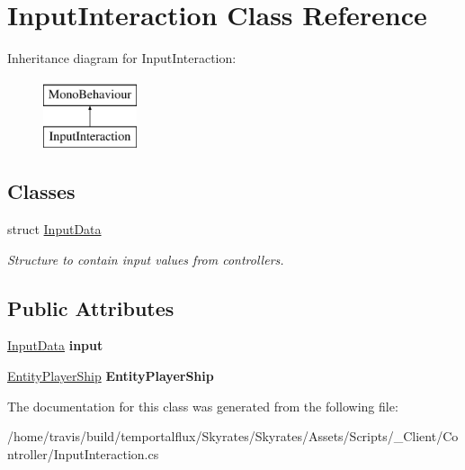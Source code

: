 \hypertarget{class_input_interaction}{\section{Input\-Interaction Class Reference}
\label{class_input_interaction}
}
Inheritance diagram for Input\-Interaction\-:\begin{figure}[H]
\begin{center}
\leavevmode
\includegraphics[height=2.000000cm]{class_input_interaction}
\end{center}
\end{figure}
\subsection*{Classes}
\begin{DoxyCompactItemize}
\item 
struct \hyperlink{struct_input_interaction_1_1_input_data}{Input\-Data}
\begin{DoxyCompactList}\small\item\em Structure to contain input values from controllers. \end{DoxyCompactList}\end{DoxyCompactItemize}
\subsection*{Public Attributes}
\begin{DoxyCompactItemize}
\item 
\hypertarget{class_input_interaction_a65feda331718482c2c867a0b05b4414e}{\hyperlink{struct_input_interaction_1_1_input_data}{Input\-Data} {\bfseries input}}\label{class_input_interaction_a65feda331718482c2c867a0b05b4414e}

\item 
\hypertarget{class_input_interaction_a94a199f25f8c5499bd8ce958164dc059}{\hyperlink{class_skyrates_1_1_client_1_1_entity_player_ship}{Entity\-Player\-Ship} {\bfseries Entity\-Player\-Ship}}\label{class_input_interaction_a94a199f25f8c5499bd8ce958164dc059}

\end{DoxyCompactItemize}


The documentation for this class was generated from the following file\-:\begin{DoxyCompactItemize}
\item 
/home/travis/build/temportalflux/\-Skyrates/\-Skyrates/\-Assets/\-Scripts/\-\_\-\-Client/\-Controller/Input\-Interaction.\-cs\end{DoxyCompactItemize}
